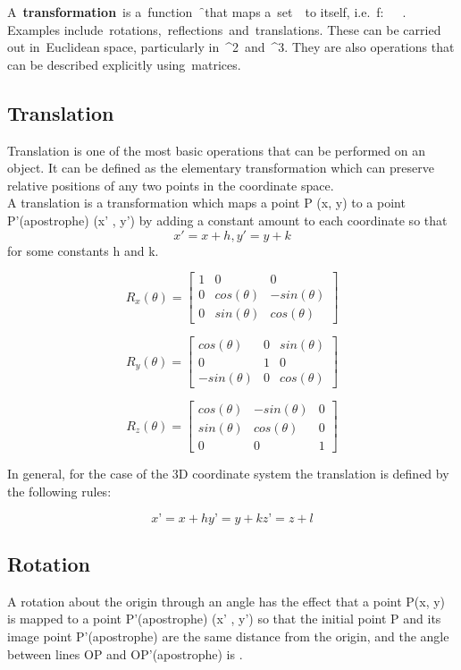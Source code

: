 \documentclass[12pt]{report}
\begin{document}
A \textbf{transformation} is a function \f that maps a set \chi to itself, i.e. f: \chi \rightarrow \chi. Examples include rotations, reflections and translations. These can be carried out in Euclidean space, particularly in ^2 and ^3. They are also operations that can be described explicitly using matrices.

\subsection{Translation}
Translation is one of the most basic operations that can be performed on an object. It can be defined as the elementary transformation which can preserve relative positions of any two points in the coordinate space. 
\vspace{0.3cm}
\\
A translation is a transformation which maps a point P (x, y) to a point P'(apostrophe) (x’ , y’) by adding a constant amount to each coordinate so that 
\[ x' = x + h, y' = y + k \] for some constants h and k.

\[ R_{x}(\theta) = \begin{bmatrix}
1 & 0 & 0 \\
0 & cos(\theta) & -sin(\theta) \\
0 & sin(\theta) & cos(\theta) 
\end{bmatrix} \]


\[ R_{y}(\theta) = \begin{bmatrix}
cos(\theta) & 0 & sin(\theta) \\
0 & 1 & 0 \\
-sin(\theta) & 0 & cos(\theta) 
\end{bmatrix} \]


\[ R_{z}(\theta) = \begin{bmatrix}
cos(\theta) & -sin(\theta) & 0 \\
sin(\theta) & cos(\theta) & 0 \\
0 & 0 & 1 
\end{bmatrix} \]

In general, for the case of the 3D coordinate system the translation is defined by the following rules:

\[ 		x’ = x + h	y’ = y + k	z’ = z + l  \]

\subsection{Rotation}

A rotation about the origin through an angle \theta has the effect that a point P(x, y) is mapped to a point P’(apostrophe) (x’ , y’) so that the initial point P and its image point P’(apostrophe) are the same distance from the origin, and the angle between lines OP and OP’(apostrophe) is \theta.
\vspace{0.3cm}
\end{document}
